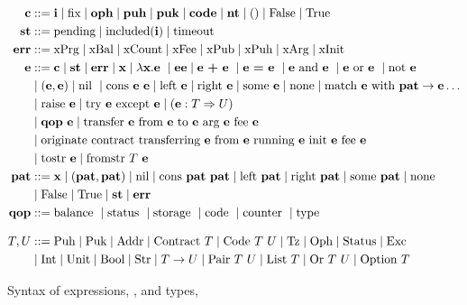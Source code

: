 \documentclass[a4paper]{llncs}
\begin{document}
\begin{figure}[tp]
\begin{align*}
  \CONSTANT & ::= \INT \mid \FIX
              \mid \OPH \mid \PUH \mid\PUK \mid \CODE \mid
              \NTEZ \mid \SUNIT \mid \FALSE \mid \TRUE \\
  \STATUS & ::= \STATUSPENDING \mid \STATUSINCLUDING (\INT) \mid
            \STATUSTIMEOUT \\
  \ERROR &::= \ERRPRG \mid \ERRBAL \mid \ERRCOUNT \mid \ERRFEE \mid
           \ERRPUK \mid \ERRPUH \mid \ERRARG \mid \ERRINIT\\
	\EXPR & :: =  \CONSTANT \mid \STATUS \mid \ERROR \mid \VARIABLE \mid \lambda \VARIABLE. \EXPR\ 
	\mid \EXPR\EXPR  %
  \mid \EXPR\ \PLUS\ \EXPR\ \mid
  \EXPR\ \EQUAL\ \EXPR\
  \mid \EXPR\ \AND\ \EXPR\ \mid \EXPR\ \OR\ \EXPR\ \mid \NOT\ \EXPR
  \\& \mid (\EXPR,\EXPR)\mid \NIL\ \mid \CONS\ \EXPR\ \EXPR \mid \LEFT\ \EXPR \mid\RIGHT\
  \EXPR \mid \SOME\ \EXPR \mid \NONE
  \mid \MATCH\ \EXPR\ \WITH\ \PATTERN\to\EXPR \dots 
  \\& \mid \RAISE\ \EXPR \mid \TRY\ \EXPR\ \EXCEPT\ \EXPR \mid \CAST\EXPR\TYPE\TYPEU
  \\& \mid \QOP\  \EXPR \mid \TRANSFER[\EXPR]\EXPR\EXPR\EXPR\EXPR
  \\& \mid \ORIGINATE\EXPR\EXPR\EXPR\EXPR\EXPR
  \\& \mid \TOSTRING\ \EXPR \mid \FROMSTRING\ \TYPE\ \EXPR
  \\
  \PATTERN &::= \VARIABLE \mid (\PATTERN, \PATTERN) \mid \NIL \mid \CONS\ \PATTERN\ \PATTERN \mid \LEFT\ \PATTERN \mid\RIGHT\
             \PATTERN \mid \SOME\ \PATTERN \mid \NONE \\
  &\mid \FALSE \mid \TRUE \mid \STATUS \mid \ERROR\\
  \QOP & ::= \GETBALANCE{} \mid \GETSTATUS{} \mid \GETSTORAGE{} \mid \GETCODE{} \mid \GETCOUNTER{}
         \mid \GETTYPE{}
  \\[2ex]
  \TYPE, \TYPEU & ::=
                  \TPUH \mid
                  \TPUK \mid
                  \TADDR \mid 
                  \TCONTRACT\ \TYPE \mid
                  \TCODE\ \TYPE\ \TYPEU \mid \TTEZ \mid
                  \TOPH \mid
                  \TSTATUS \mid \TEXCEPTION \\
  & \mid \TINT \mid \TUNIT \mid \TBOOL \mid \TSTRING \mid \TYPE\to\TYPEU \mid \TPAIR\ \TYPE\ \TYPEU \mid \TLIST\ \TYPE
    \mid \TSUM\ \TYPE\ \TYPEU \mid \TOPTION\ \TYPE 
\end{align*}
  \caption{Syntax of expressions, \EXPR, and types, \TYPE}
  \label{fig:syntax-expressions}
\end{figure}
\end{document}
